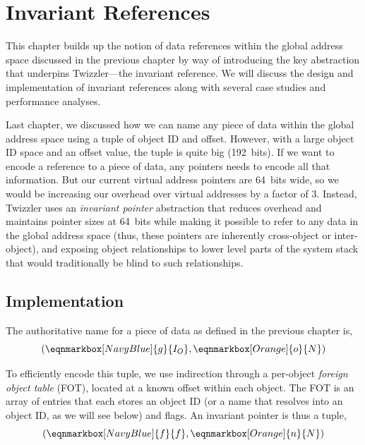 
\chapter{Invariant References}\label{ch:invariant}

\begin{chabstract}
    This chapter builds up the notion of data references within the global address space discussed in the previous chapter by way of introducing the key abstraction that underpins
    Twizzler---the invariant reference. We will discuss the design and implementation of invariant references along with several case studies and performance analyses.
\end{chabstract}


Last chapter, we discussed how we can name any piece of data within the global address space using a tuple of object ID
and offset. However, with a large object ID space and an offset value, the tuple is quite big (192~bits). If we want to
encode a reference to a piece of data, any pointers needs to encode all that information. But our current virtual
address pointers are 64~bits wide, so we would be increasing our overhead over virtual addresses by a factor of 3.
Instead, Twizzler uses an \emph{invariant pointer} abstraction that reduces overhead and maintains pointer sizes at
64~bits while making it possible to refer to any data in the global address space (thus, these pointers are inherently
cross-object or inter-object), and exposing object relationships to lower level parts of the system stack that would
traditionally be blind to such relationships.

\section{Implementation}


The authoritative name for a piece of data as defined in the previous chapter is,
\begin{equation*}
    (
    \eqnmarkbox[NavyBlue]{g}{I_O}
    , \eqnmarkbox[Orange]{o}{N})
\end{equation*}

To efficiently encode this tuple, we use indirection through a per-object \textit{foreign
    object table} (FOT), located at a known offset within each object. The FOT is an array of entries
that each stores an object ID (or a name that resolves into an object ID, as we will see
below) and flags. An invariant pointer is thus a tuple,
\begin{equation*}
    (
    \eqnmarkbox[NavyBlue]{f}{f}
    , \eqnmarkbox[Orange]{n}{N})
\end{equation*}

